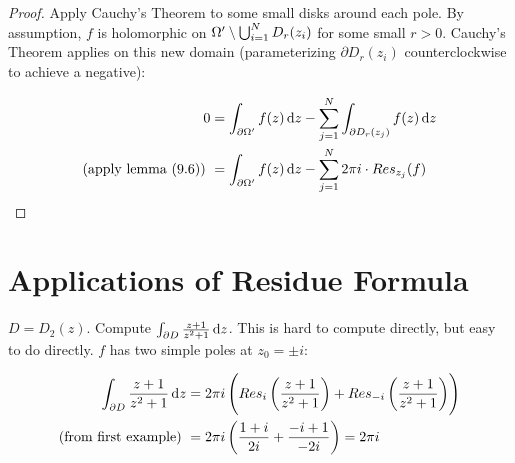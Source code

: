 \begin{proof}
Apply Cauchy's Theorem to some small disks around each pole. By assumption, $f$ is holomorphic on $\Omega ' \setminus \bigcup_{i=1}^N D_r(z_i)$ for some small $r>0$. Cauchy's Theorem applies on this new domain (parameterizing $\partial D_r(z_i)$ counterclockwise to achieve a negative):

\begin{align*}
    0 &= \int_{\partial \om '} f(z) \dif z - \sum_{j=1}^N \int_{\partial D_r(z_j)} f(z) \dif z\\
    \text{(apply lemma (9.6)) } &= \int_{\partial \om '} f(z) \dif z - \sum_{j=1}^N 2\pi i \cdot Res_{z_j} (f)
\end{align*}

\end{proof}


\section{Applications of Residue Formula}

\begin{example}
$D = D_2(z)$. Compute $\int_{\partial D} \frac{z+1}{z^2 + 1 } \dif z$. This is hard to compute directly, but easy to do directly. $f$ has two simple poles at $z_0 = \pm i$:

\begin{align*}
    \int_{\partial D} \frac{z+1}{z^2 + 1 } \dif z &= 2\pi i \left( Res_{i} \left( \frac{z+1}{z^2 + 1 } \right) + Res_{-i} \left( \frac{z+1}{z^2 + 1 } \right) \right)\\ \text{(from first example) } &= 2\pi i \left( \frac{1+i}{2i} + \frac{-i+1}{-2i} \right) = 2 \pi i
\end{align*}

\end{example}

